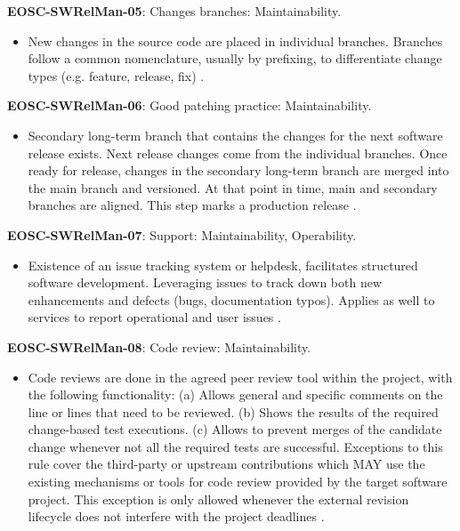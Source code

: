 \textbf{EOSC-SWRelMan-05}: Changes branches: Maintainability.

\begin{itemize}
    \item New changes in the source code are placed in individual branches. Branches follow a common nomenclature, usually by prefixing, to differentiate change types (e.g. feature, release, fix) \cite{orviz_set_2017}.
\end{itemize}

\textbf{EOSC-SWRelMan-06}: Good patching practice: Maintainability.

\begin{itemize}
    \item Secondary long-term branch that contains the changes for the next software release exists. Next release changes come from the individual branches. Once ready for release, changes in the secondary long-term branch are merged into the main branch and versioned. At that point in time, main and secondary branches are aligned. This step marks a production release \cite{orviz_set_2017,raymond_software_2013}.
\end{itemize}

\textbf{EOSC-SWRelMan-07}: Support: Maintainability, Operability.

\begin{itemize}
    \item Existence of an issue tracking system or helpdesk, facilitates structured software development. Leveraging issues to track down both new enhancements and defects (bugs, documentation typos). Applies as well to services to report operational and user issues \cite{srisopha_software_2018,shepherdson_cessda_2019,orviz_set_2017,orviz_fernandez_eosc-synergy_2020}.
\end{itemize}

\textbf{EOSC-SWRelMan-08}: Code review: Maintainability.

\begin{itemize}
    \item Code reviews are done in the agreed peer review tool within the project, with the following  functionality: (a) Allows general and specific comments on the line or lines that need to be reviewed. (b) Shows the results of the required change-based test executions. (c) Allows to prevent merges of the candidate change whenever not all the required tests are successful. Exceptions to this rule cover the third-party or upstream contributions which MAY use the existing mechanisms or tools for code review provided by the target software project. This exception is only allowed whenever the external revision lifecycle does not interfere with the project deadlines \cite{srisopha_software_2018,aberdour_achieving_2007,zuser_software_2005,orviz_set_2017}.
\end{itemize}

